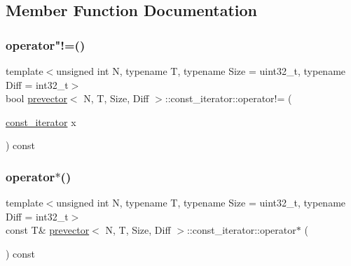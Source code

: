 \subsection{Member Function Documentation}
\mbox{\label{classprevector_1_1const__iterator_a7a7ecd92dd3a235299d794f41dcdbfb3}} 
\subsubsection{\texorpdfstring{operator"!=()}{operator!=()}}
{\footnotesize\ttfamily template$<$unsigned int N, typename T, typename Size = uint32\+\_\+t, typename Diff = int32\+\_\+t$>$ \\
bool \mbox{\hyperlink{classprevector}{prevector}}$<$ N, T, Size, Diff $>$\+::const\+\_\+iterator\+::operator!= (\begin{DoxyParamCaption}\item[{\mbox{\hyperlink{classprevector_1_1const__iterator}{const\+\_\+iterator}}}]{x }\end{DoxyParamCaption}) const\hspace{0.3cm}{\ttfamily [inline]}}

\mbox{\label{classprevector_1_1const__iterator_abb156920ba8f36757925eb258be080d4}} 
\subsubsection{\texorpdfstring{operator$\ast$()}{operator*()}}
{\footnotesize\ttfamily template$<$unsigned int N, typename T, typename Size = uint32\+\_\+t, typename Diff = int32\+\_\+t$>$ \\
const T\& \mbox{\hyperlink{classprevector}{prevector}}$<$ N, T, Size, Diff $>$\+::const\+\_\+iterator\+::operator$\ast$ (\begin{DoxyParamCaption}{ }\end{DoxyParamCaption}) const\hspace{0.3cm}{\ttfamily [inline]}}

\mbox{\label{classprevector_1_1const__iterator_a807200cb187f66698d62f6514e1511e4}} 
